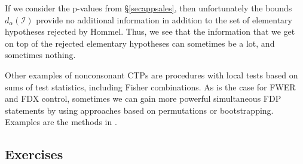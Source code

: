 \documentclass[11pt]{article}
\theoremstyle{plain}
\theoremstyle{definition}
\newcommand{\I}{\mathcal{I}}
\newcommand{\citt}{\citet}
\begin{document}
If we consider the p-values from \S\ref{secappsales}, then unfortunately the bounds $d_{\alpha}(\I)$ provide no additional information in addition to the set of elementary hypotheses rejected by Hommel. Thus, we see that the information that we get on top of the rejected elementary hypotheses can sometimes be a lot, and sometimes nothing.

Other examples of nonconsonant CTPs are procedures with local tests based on sums of test statistics, including Fisher combinations.  As is the case for FWER and FDX control, sometimes we can gain more powerful simultaneous FDP statements by using approaches  based on permutations or bootstrapping. Examples are the methods in \citt{hemerik2019permutation, blain2022notip, andreella2023permutation, vesely2023permutation}.





\subsection{Exercises}
\end{document}
